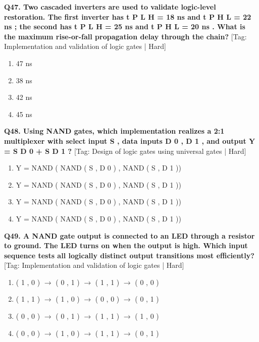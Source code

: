 \noindent\textbf{Q47. Two cascaded inverters are used to validate logic-level restoration. The first inverter has t P L H = 18 ns and t P H L = 22 ns ; the second has t P L H = 25 ns and t P H L = 20 ns . What is the maximum rise-or-fall propagation delay through the chain?} \hfill [Tag: Implementation and validation of logic gates | Hard]
\begin{enumerate}[label=(\alph*),topsep=2pt,itemsep=1pt,partopsep=0pt,parsep=0pt]
    \item {47 ns}
    \item {38 ns}
    \item {42 ns}
    \item {45 ns}
\end{enumerate}
\vspace{2mm}

\noindent\textbf{Q48. Using NAND gates, which implementation realizes a 2:1 multiplexer with select input S , data inputs D 0 , D 1 , and output Y = S D 0 + S D 1 ?} \hfill [Tag: Design of logic gates using universal gates | Hard]
\begin{enumerate}[label=(\alph*),topsep=2pt,itemsep=1pt,partopsep=0pt,parsep=0pt]
    \item {Y = NAND ( NAND ( S , D 0 ) , NAND ( S , D 1 ))}
    \item {Y = NAND ( NAND ( S , D 0 ) , NAND ( S , D 1 ))}
    \item {Y = NAND ( NAND ( S , D 0 ) , NAND ( S , D 1 ))}
    \item {Y = NAND ( NAND ( S , D 0 ) , NAND ( S , D 1 ))}
\end{enumerate}
\vspace{2mm}

\noindent\textbf{Q49. A NAND gate output is connected to an LED through a resistor to ground. The LED turns on when the output is high. Which input sequence tests all logically distinct output transitions most efficiently?} \hfill [Tag: Implementation and validation of logic gates | Hard]
\begin{enumerate}[label=(\alph*),topsep=2pt,itemsep=1pt,partopsep=0pt,parsep=0pt]
    \item {( 1 , 0 ) $\to$ ( 0 , 1 ) $\to$ ( 1 , 1 ) $\to$ ( 0 , 0 )}
    \item {( 1 , 1 ) $\to$ ( 1 , 0 ) $\to$ ( 0 , 0 ) $\to$ ( 0 , 1 )}
    \item {( 0 , 0 ) $\to$ ( 0 , 1 ) $\to$ ( 1 , 1 ) $\to$ ( 1 , 0 )}
    \item {( 0 , 0 ) $\to$ ( 1 , 0 ) $\to$ ( 1 , 1 ) $\to$ ( 0 , 1 )}
\end{enumerate}
\vspace{2mm}

